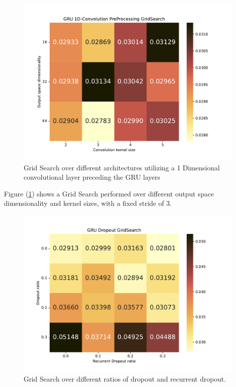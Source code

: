 \documentclass
[twocolumn,
secnumarabic,
nobibnotes,
aps,
prl,
reprint,
groupedaddress,
amsmath,
amssymb,
]{revtex4-2}
\begin{document}
\begin{figure}
  \includegraphics[width=\columnwidth]{figures/Large_forecast_conv_gridsearch_gru.pdf}
  \caption{\label{fig_gsconv}Grid Search over different architectures utilizing a 1 Dimensional convolutional layer preceding the GRU layers}
\end{figure}

Figure (\ref{fig_gsconv}) shows a Grid Search performed over different output space dimensionality and kernel sizes, with a fixed stride of 3.

\begin{figure}
  \includegraphics[width=\columnwidth]{figures/Large_forecast_dropout_gridsearch_gru.pdf}
  \caption{\label{fig_gsdrop}Grid Search over different ratios of dropout and recurrent dropout.}
\end{figure}
\end{document}
